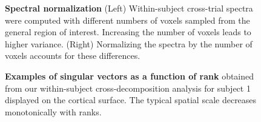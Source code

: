 \documentclass[10pt]{article}
\begin{document}
\begin{figure}[H]


\caption{\label{fig-vary-n-voxels}\textbf{Spectral normalization} (Left)
Within-subject cross-trial spectra were computed with different numbers
of voxels sampled from the general region of interest. Increasing the
number of voxels leads to higher variance. (Right) Normalizing the
spectra by the number of voxels accounts for these differences.}

\end{figure}%

\begin{figure}[H]


\caption{\label{fig-singular-vectors}\textbf{Examples of singular
vectors as a function of rank} obtained from our within-subject
cross-decomposition analysis for subject 1 displayed on the cortical
surface. The typical spatial scale decreases monotonically with ranks.}

\end{figure}%
\end{document}
